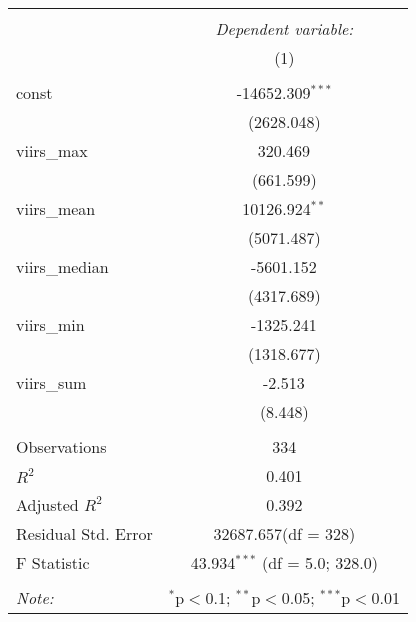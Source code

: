 \begin{table}[!htbp] \centering
\begin{tabular}{@{\extracolsep{5pt}}lc}
\\[-1.8ex]\hline
\hline \\[-1.8ex]
& \multicolumn{1}{c}{\textit{Dependent variable:}} \
\cr \cline{1-2}
\\[-1.8ex] & (1) \\
\hline \\[-1.8ex]
 const & -14652.309$^{***}$ \\
  & (2628.048) \\
 viirs_max & 320.469$^{}$ \\
  & (661.599) \\
 viirs_mean & 10126.924$^{**}$ \\
  & (5071.487) \\
 viirs_median & -5601.152$^{}$ \\
  & (4317.689) \\
 viirs_min & -1325.241$^{}$ \\
  & (1318.677) \\
 viirs_sum & -2.513$^{}$ \\
  & (8.448) \\
\hline \\[-1.8ex]
 Observations & 334 \\
 $R^2$ & 0.401 \\
 Adjusted $R^2$ & 0.392 \\
 Residual Std. Error & 32687.657(df = 328)  \\
 F Statistic & 43.934$^{***}$ (df = 5.0; 328.0) \\
\hline
\hline \\[-1.8ex]
\textit{Note:} & \multicolumn{1}{r}{$^{*}$p$<$0.1; $^{**}$p$<$0.05; $^{***}$p$<$0.01} \\
\end{tabular}
\end{table}